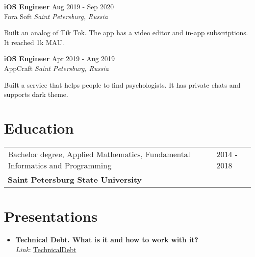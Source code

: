 \documentclass[a4paper,10pt]{article}
\begin{document}
\textbf{iOS Engineer} \hfill Aug 2019 - Sep 2020\\
Fora Soft \hfill \textit{Saint Petersburg, Russia}

Built an analog of Tik Tok. The app has a video editor and in-app subscriptions. It reached 1k MAU.

\textbf{iOS Engineer} \hfill Apr 2019 - Aug 2019\\
AppCraft \hfill \textit{Saint Petersburg, Russia}

Built a service that helps people to find psychologists. It has private chats and supports dark theme.

\section{Education}
\begin{tabularx}{\linewidth}{@{}l X@{}}	

Bachelor degree, Applied Mathematics, Fundamental Informatics and
Programming & \hfill 2014 - 2018\\ 
\textbf{Saint Petersburg State University}

\end{tabularx}

\section{Presentations}
\begin{itemize}
\itemsep -7pt {}
\item{\textbf{Technical Debt. What is it and how to work with it?}\\ \textit{Link}: \href{https://github.com/Loriens/TechnicalDebt}{TechnicalDebt}}
\end{itemize}
\end{document}
